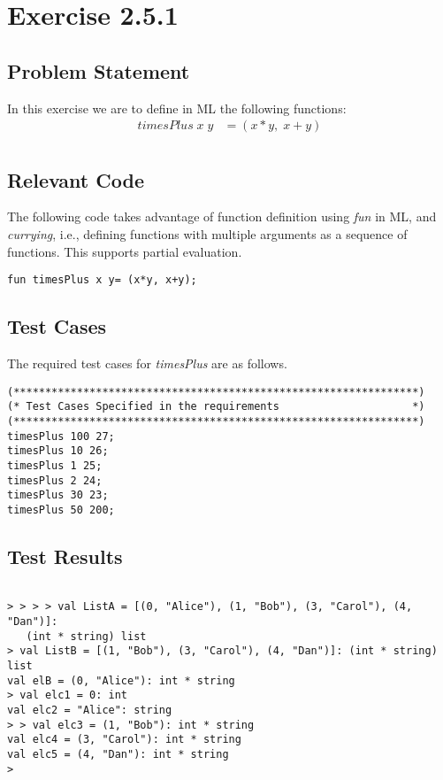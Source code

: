 \documentclass{report}
\begin{document}
\chapter{Exercise 2.5.1}
\label{cha:exercise-2.5.1}

\section{Problem Statement}
\label{sec:problem-statement-5}

In this exercise we are to define in ML the following functions:
\begin{align*}
  timesPlus\; x\; y &= (x*y,\; x+y)\\
\end{align*}

\section{Relevant Code}
\label{sec:relevant-code}

The following code takes advantage of function definition using
\emph{fun} in ML, and \emph{currying}, i.e., defining functions with multiple arguments as a sequence of functions. This supports partial evaluation.

\lstset{frameround=fftt}
\begin{lstlisting}[frame=tRBL]
  fun timesPlus x y= (x*y, x+y);
\end{lstlisting}

\section{Test Cases}
\label{sec:test-cases}
The required test cases for \emph{timesPlus} are as follows.
\begin{lstlisting}[frame = TB]
(****************************************************************)
(* Test Cases Specified in the requirements                     *)
(****************************************************************)
timesPlus 100 27;
timesPlus 10 26;
timesPlus 1 25;
timesPlus 2 24;
timesPlus 30 23;
timesPlus 50 200;

\end{lstlisting}

\section{Test Results}
\label{sec:test-results}

\setcounter{sessioncount}{0}
\begin{session}
  \begin{scriptsize}
\begin{verbatim}

> > > > val ListA = [(0, "Alice"), (1, "Bob"), (3, "Carol"), (4, "Dan")]:
   (int * string) list
> val ListB = [(1, "Bob"), (3, "Carol"), (4, "Dan")]: (int * string) list
val elB = (0, "Alice"): int * string
> val elc1 = 0: int
val elc2 = "Alice": string
> > val elc3 = (1, "Bob"): int * string
val elc4 = (3, "Carol"): int * string
val elc5 = (4, "Dan"): int * string
> 
\end{verbatim}
  \end{scriptsize}
\end{session}
\end{document}
